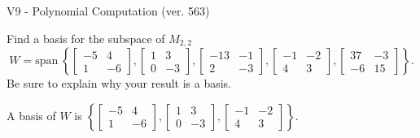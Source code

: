 \begin{exercise}
  \begin{exerciseTitle}V9 - Polynomial Computation (ver. 563)\end{exerciseTitle}
  \begin{exerciseStatement}
    Find a basis for the subspace of \(M_{2,2}\) 
\[W=\mathrm{span}\ \left\{\left[\begin{array}{cc}
-5 & 4 \\
1 & -6
\end{array}\right] , \left[\begin{array}{cc}
1 & 3 \\
0 & -3
\end{array}\right] , \left[\begin{array}{cc}
-13 & -1 \\
2 & -3
\end{array}\right] , \left[\begin{array}{cc}
-1 & -2 \\
4 & 3
\end{array}\right] , \left[\begin{array}{cc}
37 & -3 \\
-6 & 15
\end{array}\right]\right\}.\]
 Be sure to explain why your result is a basis.


  \end{exerciseStatement}
  \begin{exerciseAnswer}
   A basis of \(W\) is  \(\left\{\left[\begin{array}{cc}
-5 & 4 \\
1 & -6
\end{array}\right] , \left[\begin{array}{cc}
1 & 3 \\
0 & -3
\end{array}\right] , \left[\begin{array}{cc}
-1 & -2 \\
4 & 3
\end{array}\right]\right\}\).
  


  \end{exerciseAnswer}
\end{exercise}